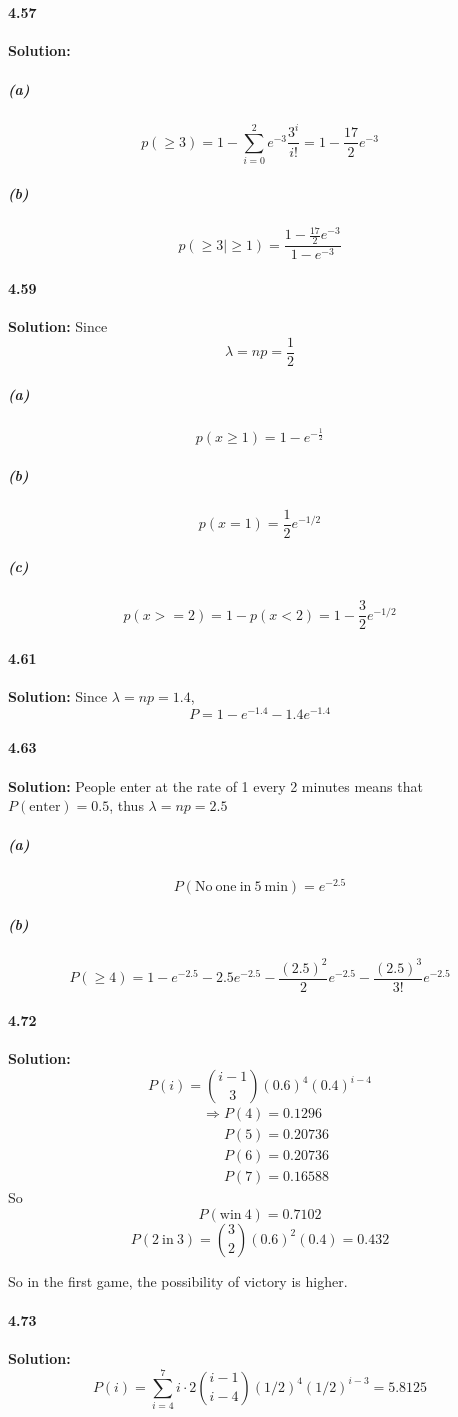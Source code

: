 \documentclass[11pt]{article}
\begin{document}
	\paragraph{4.57}\textbf{Solution:}
		\subparagraph{(a)}
			\[p(\geq 3) = 1 - \sum_{i = 0}^2 e^{-3}\frac{3^i}{i!} = 1 - \frac{17}{2}e^{-3}\]
		\subparagraph{(b)}
			\[p(\geq 3 | \geq 1) = \frac{1 - \frac{17}{2}e^{-3}}{1 - e^{-3}}\]
	\paragraph{4.59}\textbf{Solution:}
		Since \[\lambda = np = \frac{1}{2}\]
		\subparagraph{(a)}
			\[p(x \geq 1) = 1 - e^{-\frac{1}{2}}\]
		\subparagraph{(b)}
			\[p(x = 1) = \frac{1}{2}e^{-1/2}\]
		\subparagraph{(c)}
			\[p(x >= 2) = 1 - p(x < 2) = 1 - \frac{3}{2}e^{-1/2}\]
	\paragraph{4.61}\textbf{Solution:} Since $\lambda = np = 1.4$, \[P = 1 - e^{-1.4} - 1.4e^{-1.4}\]
	\paragraph{4.63}\textbf{Solution:}
		People enter at the rate of 1 every 2 minutes means that $P(\mathrm{enter}) = 0.5$, thus $\lambda = np = 2.5$
		\subparagraph{(a)}
			\[P(\mathrm{No\ one\ in\ 5\ min}) = e^{-2.5}\]
		\subparagraph{(b)}
			\[P(\mathrm{\mathrm{\geq 4}}) = 1 - e^{-2.5} - 2.5e^{-2.5} - \frac{(2.5)^2}{2}e^{-2.5} - \frac{(2.5)^3}{3!}e^{-2.5}\]
	\paragraph{4.72}\textbf{Solution:}
		\[P(i) = \binom{i - 1}{3}(0.6)^4(0.4)^{i - 4}\]
		\begin{align}
			&\Rightarrow P(4) = 0.1296\nonumber\\
			&\phantom{\Rightarrow}P(5) = 0.20736\nonumber\\
			&\phantom{\Rightarrow}P(6) = 0.20736\nonumber\\
			&\phantom{\Rightarrow}P(7) = 0.16588\nonumber
		\end{align}
		So \[P(\mathrm{win}\ 4) = 0.7102\]
		\[P(2\ \mathrm{in}\ 3) = \binom{3}{2}(0.6)^2(0.4) = 0.432\]
		
		 So in the first game, the possibility of victory is higher. 
	\paragraph{4.73}\textbf{Solution:}
		\[P(i) = \sum_{i = 4}^7 i \cdot 2\binom{i - 1}{i - 4}(1/2)^4(1/2)^{i - 3} = 5.8125\]
\end{document}
